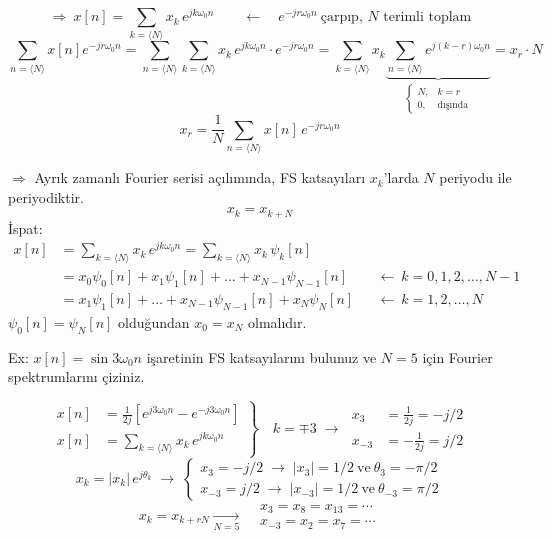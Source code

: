 \documentclass[11pt,a4paper]{article}
\begin{document}
\[ \Rightarrow\ x[n]=\sum_{k=\langle N\rangle} x_k\, e^{jk\omega_0 n} \qquad\longleftarrow\quad e^{-jr\omega_0 n}\ \text{çarpıp, $N$ terimli toplam} \]
\[ \sum_{n=\langle N\rangle} x[n]e^{-jr\omega_0 n} = \sum_{n=\langle N\rangle}\sum_{k=\langle N\rangle} x_k\, e^{jk\omega_0 n}\cdot e^{-jr\omega_0 n}
   = \sum_{k=\langle N\rangle} x_k \underbrace{\sum_{n=\langle N\rangle} e^{j(k-r)\omega_0 n}}_{\begin{cases}N, & k=r\\ 0, & \text{dışında}\end{cases}} = x_r\cdot N \]
\[ x_r=\frac{1}{N}\sum_{n=\langle N\rangle} x[n]\,e^{-jr\omega_0 n} \]

$\Rightarrow$ Ayrık zamanlı Fourier serisi açılımında, FS katsayıları $x_k$'larda $N$ periyodu ile periyodiktir.
\[ x_k=x_{k+N} \]
İspat:
\begin{align*}
x[n] &= \sum_{k=\langle N\rangle} x_k\, e^{jk\omega_0 n} = \sum_{k=\langle N\rangle} x_k\, \psi_k[n]\\
&= x_0\psi_0[n]+x_1\psi_1[n]+\dots+x_{N-1}\psi_{N-1}[n] && \longleftarrow\ k=0,1,2,\dots,N-1\\
&= x_1\psi_1[n]+\dots+x_{N-1}\psi_{N-1}[n]+x_N\psi_N[n] && \longleftarrow\ k=1,2,\dots,N
\end{align*}
$\psi_0[n]=\psi_N[n]$ olduğundan $x_0=x_N$ olmalıdır.

\begin{ornek}
Ex: $x[n]=\sin 3\omega_0 n$ işaretinin FS katsayılarını bulunuz ve $N=5$ için Fourier spektrumlarını çiziniz.
\end{ornek}
\[ \left.\begin{aligned}
x[n] &= \frac{1}{2j}\left[e^{j3\omega_0 n}-e^{-j3\omega_0 n}\right]\\
x[n] &= \sum_{k=\langle N\rangle} x_k\, e^{jk\omega_0 n}
\end{aligned}\right\}\quad k=\mp3 \;\longrightarrow\;
\begin{aligned}
x_3 &= \frac{1}{2j}=-j/2\\
x_{-3} &= -\frac{1}{2j}=j/2
\end{aligned} \]
\[ x_k=|x_k|\,e^{j\theta_k} \;\longrightarrow\;
\begin{cases}
x_3=-j/2 \;\longrightarrow\; |x_3|=1/2 \ \text{ve}\ \theta_3=-\pi/2\\[1mm]
x_{-3}=j/2 \;\longrightarrow\; |x_{-3}|=1/2 \ \text{ve}\ \theta_{-3}=\pi/2
\end{cases} \]
\[ x_k=x_{k+rN} \xrightarrow[N=5]{} \begin{aligned} &x_3=x_8=x_{13}=\cdots\\ &x_{-3}=x_2=x_7=\cdots \end{aligned} \]
\end{document}
